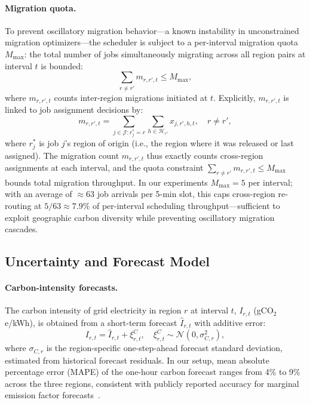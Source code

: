 \documentclass[a4paper,fleqn]{cas-dc}
\begin{document}
\paragraph{Migration quota.}
To prevent oscillatory migration behavior---a known instability in unconstrained migration optimizers---the scheduler is subject to a per-interval migration quota $M_{\max}$: the total number of jobs simultaneously migrating across all region pairs at interval $t$ is bounded:
\begin{equation}
\sum_{r \neq r'} m_{r,r',t} \leq M_{\max},
\end{equation}
where $m_{r,r',t}$ counts inter-region migrations initiated at $t$. Explicitly, $m_{r,r',t}$ is linked to job assignment decisions by:
\begin{equation}
m_{r,r',t} = \sum_{j \in \mathcal{J}: r^*_j = r} \sum_{h \in \mathcal{H}_{r'}} x_{j,r',h,t}, \quad r \neq r',
\end{equation}
where $r^*_j$ is job $j$'s region of origin (i.e., the region where it was released or last assigned). The migration count $m_{r,r',t}$ thus exactly counts cross-region assignments at each interval, and the quota constraint $\sum_{r \neq r'} m_{r,r',t} \leq M_{\max}$ bounds total migration throughput. In our experiments $M_{\max} = 5$ per interval; with an average of $\approx$63 job arrivals per 5-min slot, this caps cross-region re-routing at $5/63 \approx 7.9\%$ of per-interval scheduling throughput---sufficient to exploit geographic carbon diversity while preventing oscillatory migration cascades.

\subsection{Uncertainty and Forecast Model}
\label{sec:uncertainty}

\paragraph{Carbon-intensity forecasts.}
The carbon intensity of grid electricity in region $r$ at interval $t$, $I_{r,t}$ (gCO$_{2}$e/kWh), is obtained from a short-term forecast $\hat{I}_{r,t}$ with additive error:
\begin{equation}
I_{r,t} = \hat{I}_{r,t} + \xi^C_{r,t}, \quad \xi^C_{r,t} \sim \mathcal{N}(0, \sigma^2_{C,r}),
\end{equation}
where $\sigma_{C,r}$ is the region-specific one-step-ahead forecast standard deviation, estimated from historical forecast residuals. In our setup, mean absolute percentage error (MAPE) of the one-hour carbon forecast ranges from 4\% to 9\% across the three regions, consistent with publicly reported accuracy for marginal emission factor forecasts~\cite{ref-radovanovic21}.
\end{document}
